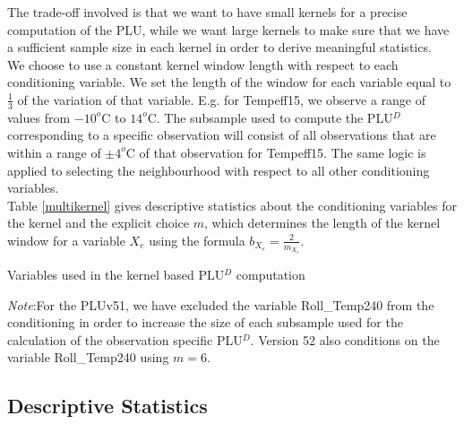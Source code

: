 \begin{subappendices}
The trade-off involved is that we want to have small kernels for a precise computation of the PLU, while we want large kernels to make sure that we have a sufficient sample size in each kernel in order to derive meaningful statistics. \\

We choose to use a constant kernel window length with respect to each conditioning variable. We set the length of the window for each variable equal to $\frac{1}{3}$ of the variation of that variable. E.g. for Tempeff15, we observe a range of values from $-10^o$C to $14^o$C. The subsample used to compute the PLU$^D$ corresponding to a specific observation will consist of all observations that are within a range of $\pm 4^o$C of that observation for Tempeff15. The same logic is applied to selecting the neighbourhood with respect to all other conditioning variables. \\

Table \ref{multikernel} gives descriptive statistics about the conditioning variables for the kernel and the explicit choice $m$, which determines the length of the kernel window for a variable $X_e$ using the formula $b_{X_e} = \frac{2}{m_{X_e}}$.\\


\begin{table}[!ht]
\vspace{-0cm}

\caption{\label{multikernel} Variables used in the kernel based PLU$^D$ computation}
\emph{Note}:For the PLUv51, we have excluded the variable Roll\_Temp240 from the conditioning in order to increase the size of each subsample used for the calculation of the observation specific PLU$^D$. Version 52 also conditions on the variable Roll\_Temp240 using $m=6$.
\end{table}


\subsection{Descriptive Statistics}
\label{statdes}

\end{subappendices}
